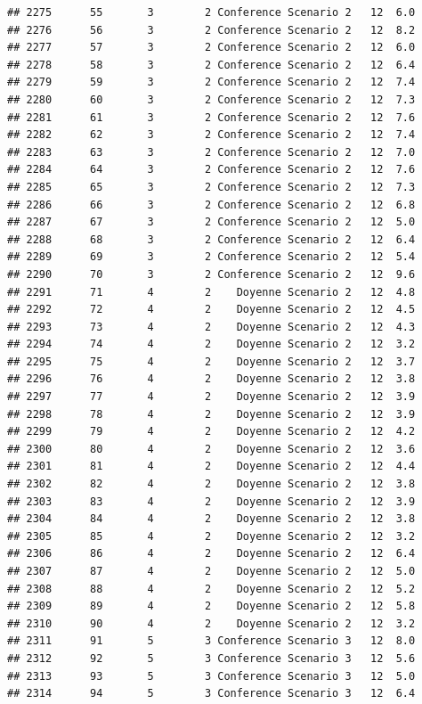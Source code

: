 \documentclass[
]{article}
\begin{document}
\begin{verbatim}
## 2275      55       3        2 Conference Scenario 2   12  6.0
## 2276      56       3        2 Conference Scenario 2   12  8.2
## 2277      57       3        2 Conference Scenario 2   12  6.0
## 2278      58       3        2 Conference Scenario 2   12  6.4
## 2279      59       3        2 Conference Scenario 2   12  7.4
## 2280      60       3        2 Conference Scenario 2   12  7.3
## 2281      61       3        2 Conference Scenario 2   12  7.6
## 2282      62       3        2 Conference Scenario 2   12  7.4
## 2283      63       3        2 Conference Scenario 2   12  7.0
## 2284      64       3        2 Conference Scenario 2   12  7.6
## 2285      65       3        2 Conference Scenario 2   12  7.3
## 2286      66       3        2 Conference Scenario 2   12  6.8
## 2287      67       3        2 Conference Scenario 2   12  5.0
## 2288      68       3        2 Conference Scenario 2   12  6.4
## 2289      69       3        2 Conference Scenario 2   12  5.4
## 2290      70       3        2 Conference Scenario 2   12  9.6
## 2291      71       4        2    Doyenne Scenario 2   12  4.8
## 2292      72       4        2    Doyenne Scenario 2   12  4.5
## 2293      73       4        2    Doyenne Scenario 2   12  4.3
## 2294      74       4        2    Doyenne Scenario 2   12  3.2
## 2295      75       4        2    Doyenne Scenario 2   12  3.7
## 2296      76       4        2    Doyenne Scenario 2   12  3.8
## 2297      77       4        2    Doyenne Scenario 2   12  3.9
## 2298      78       4        2    Doyenne Scenario 2   12  3.9
## 2299      79       4        2    Doyenne Scenario 2   12  4.2
## 2300      80       4        2    Doyenne Scenario 2   12  3.6
## 2301      81       4        2    Doyenne Scenario 2   12  4.4
## 2302      82       4        2    Doyenne Scenario 2   12  3.8
## 2303      83       4        2    Doyenne Scenario 2   12  3.9
## 2304      84       4        2    Doyenne Scenario 2   12  3.8
## 2305      85       4        2    Doyenne Scenario 2   12  3.2
## 2306      86       4        2    Doyenne Scenario 2   12  6.4
## 2307      87       4        2    Doyenne Scenario 2   12  5.0
## 2308      88       4        2    Doyenne Scenario 2   12  5.2
## 2309      89       4        2    Doyenne Scenario 2   12  5.8
## 2310      90       4        2    Doyenne Scenario 2   12  3.2
## 2311      91       5        3 Conference Scenario 3   12  8.0
## 2312      92       5        3 Conference Scenario 3   12  5.6
## 2313      93       5        3 Conference Scenario 3   12  5.0
## 2314      94       5        3 Conference Scenario 3   12  6.4

\end{verbatim}
\end{document}
